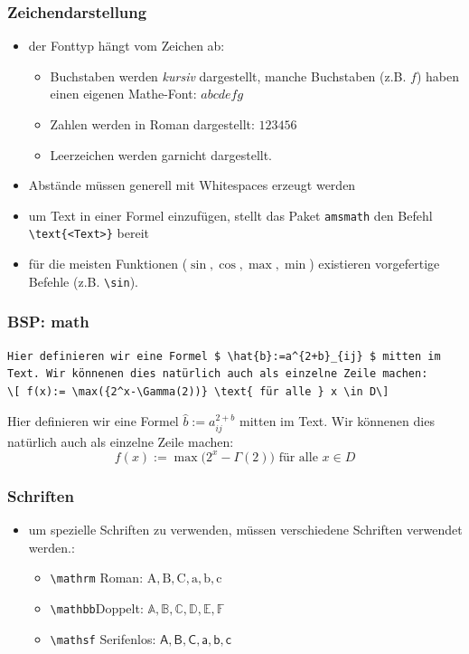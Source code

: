 \begin{frame}[fragile]
\frametitle{Zeichendarstellung}
\begin{itemize}[<+->]
  \item der Fonttyp hängt vom Zeichen ab:
  \begin{itemize}
    \item Buchstaben werden \textit{kursiv} dargestellt, manche Buchstaben (z.B. $f$) haben einen eigenen Mathe-Font: $abcdefg$
    \item Zahlen werden in Roman dargestellt: $123456$
    \item Leerzeichen werden garnicht dargestellt.
  \end{itemize}
  \item Abstände müssen generell mit Whitespaces erzeugt werden
  \item um Text in einer Formel einzufügen, stellt das Paket \texttt{amsmath} den Befehl \lstinline[style=Latex]+\text{<Text>}+ bereit
\item für die meisten Funktionen ($\sin,\cos,\max,\min $) existieren vorgefertige Befehle (z.B. \lstinline[style=Latex]+\sin+).
\end{itemize}
\end{frame}

\begin{frame}[fragile]
\frametitle{BSP: math}
\begin{lstlisting}[style=Latex]
Hier definieren wir eine Formel $ \hat{b}:=a^{2+b}_{ij} $ mitten im Text. Wir könnenen dies natürlich auch als einzelne Zeile machen:
\[ f(x):= \max({2^x-\Gamma(2))} \text{ für alle } x \in D\]
\end{lstlisting}

Hier definieren wir eine Formel $ \hat{b}:=a^{2+b}_{ij} $ mitten im Text. Wir könnenen dies natürlich auch als einzelne Zeile machen:
\[ f(x):= \max({2^x-\Gamma(2))} \text{ für alle } x \in D\]

\end{frame}

\begin{frame}[fragile]
\frametitle{Schriften}
\begin{itemize}[<+->]
  \item um spezielle Schriften zu verwenden, müssen verschiedene Schriften verwendet werden.:
  \begin{itemize}
     \item \lstinline[style=Latex]+\mathrm+ Roman: $\mathrm{A,B,C,a,b,c}$ 
     \item \lstinline[style=Latex]+\mathbb+\footnotemark[1]\footnotemark[2] Doppelt: $\mathbb{A,B,C,D,E,F}$ 
    \item \lstinline[style=Latex]+\mathsf+ Serifenlos: $\mathsf{A,B,C,a,b,c}$ 
  \end{itemize}
\end{itemize}
\end{frame}

